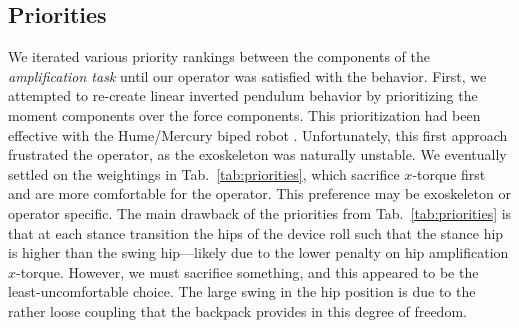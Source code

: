 \documentclass[utf8]{frontiersSCNS}
\renewcommand*{\cite}[1]{\citep{#1}}
\begin{document}

\subsection{Priorities}

We iterated various priority rankings between the components of the \emph{amplification task} until our operator was satisfied with the behavior.
First, we attempted to re-create linear inverted pendulum behavior by prioritizing the moment components over the force components. This prioritization had been effective with the Hume/Mercury biped robot \cite{KimEA2016TRO,KimJorgensenSentis2020IJRR}. %
Unfortunately, this first approach frustrated the operator, as the exoskeleton was naturally unstable.
We eventually settled on the weightings in Tab.~\ref{tab:priorities}, which sacrifice $x$-torque first and are more comfortable for the operator.
This preference may be exoskeleton or operator specific.
The main drawback of the priorities from Tab.~\ref{tab:priorities} is that at each stance transition the hips of the device roll such that the stance hip is higher than the swing hip---likely due to the lower penalty on hip amplification $x$-torque.
However, we must sacrifice something, and this appeared to be the least-uncomfortable choice. The large swing in the hip position is due to the rather loose coupling that the backpack provides in this degree of freedom.
\end{document}
